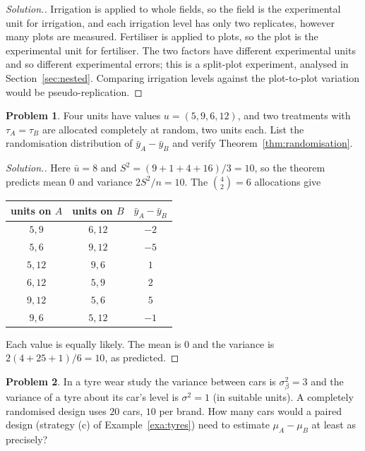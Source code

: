 \documentclass[11pt,a4paper]{article}
\numberwithin{equation}{section}
\theoremstyle{definition}
\newtheorem{problemx}{Problem}[subsection]
\newenvironment{problem}{\begin{problemx}}{\end{problemx}}
\newenvironment{solution}
  {\renewcommand{\qedsymbol}{}\begin{proof}[\textit{Solution}.]}
  {\end{proof}}
\begin{document}
\begin{solution}
Irrigation is applied to whole fields, so the field is the experimental unit for irrigation, and each irrigation level has only two replicates, however
many plots are measured. Fertiliser is applied to plots, so the plot is the experimental unit for fertiliser. The two factors have different
experimental units and so different experimental errors; this is a split-plot experiment, analysed in
Section~\ref{sec:nested}. Comparing irrigation levels
against the plot-to-plot variation would be pseudo-replication.
\end{solution}

\begin{problem}
Four units have values $u = (5, 9, 6, 12)$, and two treatments with $\tau_A = \tau_B$ are allocated completely at random, two units each. List the
randomisation distribution of $\bar y_A - \bar y_B$ and verify Theorem~\ref{thm:randomisation}.
\end{problem}

\begin{solution}
Here $\bar u = 8$ and $S^2 = (9 + 1 + 4 + 16)/3 = 10$, so the theorem predicts mean $0$ and variance $2S^2/n = 10$. The $\binom42 = 6$ allocations give
\begin{center}
\begin{tabular}{cc|c}
units on $A$ & units on $B$ & $\bar y_A - \bar y_B$ \\
\hline
$5, 9$ & $6, 12$ & $-2$ \\
$5, 6$ & $9, 12$ & $-5$ \\
$5, 12$ & $9, 6$ & $1$ \\
$6, 12$ & $5, 9$ & $2$ \\
$9, 12$ & $5, 6$ & $5$ \\
$9, 6$ & $5, 12$ & $-1$
\end{tabular}
\end{center}
Each value is equally likely. The mean is $0$ and the variance is $2(4 + 25 + 1)/6 = 10$, as predicted.
\end{solution}

\begin{problem}
In a tyre wear study the variance between cars is $\sigma_\beta^2 = 3$ and the variance of a tyre about its car's level is $\sigma^2 = 1$ (in suitable
units). A completely randomised design uses $20$ cars, $10$ per brand. How many cars would a paired design (strategy (c) of
Example~\ref{exa:tyres}) need to estimate $\mu_A - \mu_B$ at least as precisely?
\end{problem}
\end{document}
